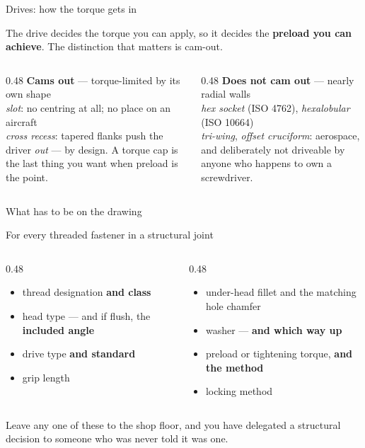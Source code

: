 \documentclass[aspectratio=169,10pt]{beamer}
\begin{document}
\begin{frame}{Drives: how the torque gets in}
\centering
\resizebox{0.98\textwidth}{!}{}
\vfill
\raggedright
The drive decides the torque you can apply, so it decides the \textbf{preload you can achieve}. The
distinction that matters is \alert{cam-out}.
\vfill
\begin{columns}[T]
\begin{column}{0.48\textwidth}
{\footnotesize
\textbf{Cams out} --- torque-limited by its own shape\\
\emph{slot}: no centring at all; no place on an aircraft\\
\emph{cross recess}: tapered flanks push the driver \emph{out} --- by design. A torque cap is the
last thing you want when preload is the point.}
\end{column}
\begin{column}{0.48\textwidth}
{\footnotesize
\textbf{Does not cam out} --- nearly radial walls\\
\emph{hex socket} (ISO 4762), \emph{hexalobular} (ISO 10664)\\
\emph{tri-wing}, \emph{offset cruciform}: aerospace, and deliberately not driveable by anyone who
happens to own a screwdriver.}
\end{column}
\end{columns}
\end{frame}

\begin{frame}{What has to be on the drawing}
\begin{alertblock}{For every threaded fastener in a structural joint}
\begin{columns}[T]
\begin{column}{0.48\textwidth}
\vspace{4pt}
\begin{itemize}
\item thread designation \textbf{and class}
\item head type --- and if flush, the \textbf{included angle}
\item drive type \textbf{and standard}
\item grip length
\end{itemize}
\end{column}
\begin{column}{0.48\textwidth}
\vspace{4pt}
\begin{itemize}
\item under-head fillet and the matching hole chamfer
\item washer --- \textbf{and which way up}
\item preload or tightening torque, \textbf{and the method}
\item locking method
\end{itemize}
\end{column}
\end{columns}
\end{alertblock}
\vfill
\centering
\large Leave any one of these to the shop floor, and you have delegated a structural decision to
someone who was never told it was one.
\end{frame}
\end{document}
